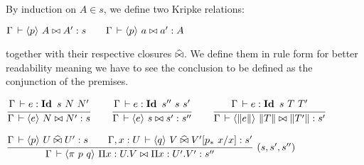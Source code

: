 \documentclass[a4paper,english]{lipics-utf8x}
\begin{document}

  By induction on $A \in s$, we define two Kripke relations:
  \begin{center}
  \(
    \Gamma \,\vdash \langle p \rangle~ A \mathrel{\bowtie} A' : s
    \qquad
    \Gamma \,\vdash \langle p \rangle~ a \mathrel{\bowtie} a' : A
  \)
  \end{center}
  together with their respective closures $\mathrel{\widehat{\bowtie}}$.
  We define them in rule form for better readability meaning we have to see the
  conclusion to be defined as the conjunction of the premises.

  \begin{mathc}
    \qquad
  \end{mathc}

  \begin{mathc}
  \end{mathc}

  \begin{center}
  \(
    \ru{\Gamma \der e : \Id s\ N\ N'
      }{\Gamma \der \hideq{e} N \Er N' : s}
    \qquad
    \ru{\Gamma \der e : \Id s''\ s\ s'
      }{\Gamma \der \hideq{e} s \Er s' : s''}
    \qquad
    \ru{\Gamma \der e : \Id s\ T\ T'
      }{\Gamma \der \hideq{\squash{e}} \squash{T} \Er \squash{T'} : s'}
  \)
  \end{center}

  \begin{center}
  \(
    \rux{\Gamma \der \hideq{p} U \hEr U' : s \qquad
          \Gamma, x:U \der \hideq{q} V \hEr V'[p_*\ x / x] : s'
        }{\Gamma \der \hideq{\pi\ p\ q} \Pi x:U.V \Er \Pi x:U'.V' : s''
        }{(s,s',s'')}
  \)
  \end{center}

  \begin{mathc}
  \end{mathc}
\end{document}
